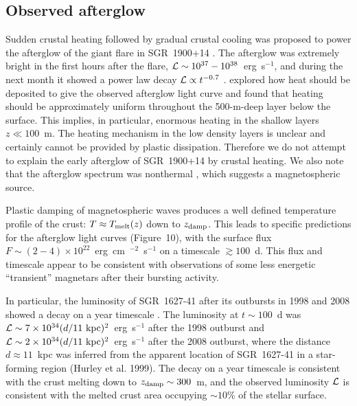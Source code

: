 \subsection{Observed afterglow}

Sudden crustal heating followed by gradual crustal cooling was proposed to power the afterglow of the giant flare in SGR~1900+14 \citep{2002ApJ...580L..69L}.
The afterglow was extremely bright in the first hours after the flare, $\mathcal{L}\sim 10^{37}-10^{38}$~erg~s$^{-1}$, and during the next month it showed a power law decay $\mathcal{L}\propto t^{-0.7}$ \citep{2001ApJ...552..748W}.
\citet{2002ApJ...580L..69L} explored how heat should be deposited to give the observed afterglow light curve and found that heating should be approximately uniform throughout the 500-m-deep layer below the surface. 
This implies, in particular, enormous heating in the shallow layers $z\ll 100$~m. 
The heating mechanism in the low density layers is unclear and certainly cannot be provided by plastic dissipation. 
Therefore we do not attempt to explain the early afterglow of SGR~1900+14 by crustal heating.
We also note that the afterglow spectrum was nonthermal \citep{2001ApJ...552..748W}, which suggests a magnetospheric source. 

Plastic damping of magnetospheric \alfven waves produces a well defined temperature profile  of the crust: $T\approx T_{\rm melt}(z)$ down to $z_{\rm damp}$. This leads to specific predictions for the afterglow light curves (Figure~10), with the surface flux $F\sim (2-4)\times 10^{22}$~erg~cm~$^{-2}$~s$^{-1}$ on a timescale $\gtrsim 100$~d. 
This flux and timescale appear to be consistent with observations of some less energetic ``transient'' magnetars after their bursting activity.

In particular, the luminosity of SGR~1627-41 after its outbursts in 1998 and 2008 showed a decay on a year timescale \citep{2006A&A...450..759M,2008MNRAS.390L..34E,2012ApJ...757...68A}. 
The luminosity at $t\sim 100$~d was $\mathcal{L}\sim 7\times 10^{34}(d/11{\rm ~kpc})^2$~erg~s$^{-1}$ after the 1998 outburst and $\mathcal{L}\sim 2\times 10^{34}(d/11{\rm ~kpc})^2$~erg~s$^{-1}$ after the 2008 outburst, where the distance $d\approx 11$~kpc was inferred from the apparent location of SGR~1627-41 in a star-forming region (Hurley et al. 1999). 
The decay on a year timescale is consistent with the crust melting down to $z_{\rm damp}\sim 300$~m, and the observed luminosity $\mathcal{L}$ is consistent with the melted crust area occupying $\sim 10$\% of the stellar surface.

